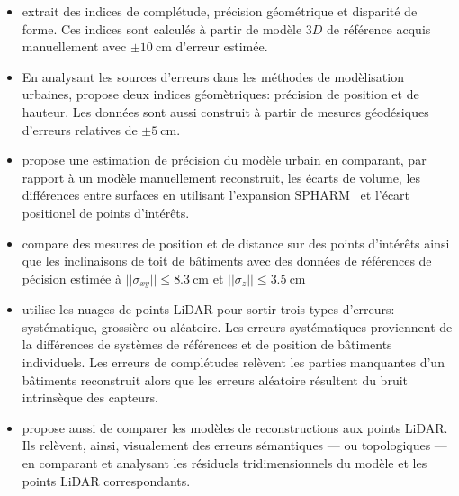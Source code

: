 \documentclass[a4paper,french]{article}
\begin{document}
    \begin{itemize}
        \item \cite{Henricsson1997} extrait des indices de complétude, précision géométrique et disparité de forme. Ces indices sont calculés à partir de modèle $3D$ de référence acquis manuellement avec $\pm \SI{10}{\cm}$ d'erreur estimée.
        \item En analysant les sources d'erreurs dans les méthodes de modèlisation urbaines, \cite{Voegtle2003} propose deux indices géomètriques: précision de position et de hauteur. Les données sont aussi construit à partir de mesures géodésiques d'erreurs relatives de $\pm \SI{5}{\cm}$.
        \item \cite{Zeng2014} propose une estimation de précision du modèle urbain en comparant, par rapport à un modèle manuellement reconstruit, les écarts de volume, les différences entre surfaces en utilisant l'expansion SPHARM~\cite{brechbuhler1995parametrization} et l'écart positionel de points d'intérêts.
        \item \cite{Kaartinen2005} compare des mesures de position et de distance sur des points d'intérêts ainsi que les inclinaisons de toit de bâtiments avec des données de références de pécision estimée à $\vert\vert \sigma_{xy} \vert\vert \leq \SI{8.3}{\cm} \text{ et } \vert \vert \sigma_z \vert\vert \leq \SI{3.5}{\cm}$
        \item \cite{Akca2010} utilise les nuages de points LiDAR pour sortir trois types d'erreurs: systématique, grossière ou aléatoire. Les erreurs systématiques proviennent de la différences de systèmes de références et de position de bâtiments individuels. Les erreurs de complétudes relèvent les parties manquantes d'un bâtiments reconstruit alors que les erreurs aléatoire résultent du bruit intrinsèque des capteurs.
        \item \cite{OudeElberink2010} propose aussi de comparer les modèles de reconstructions aux points LiDAR. Ils relèvent, ainsi, visualement des erreurs sémantiques --- ou topologiques --- en comparant et analysant les résiduels tridimensionnels du modèle et les points LiDAR correspondants.
    \end{itemize}
\end{document}

